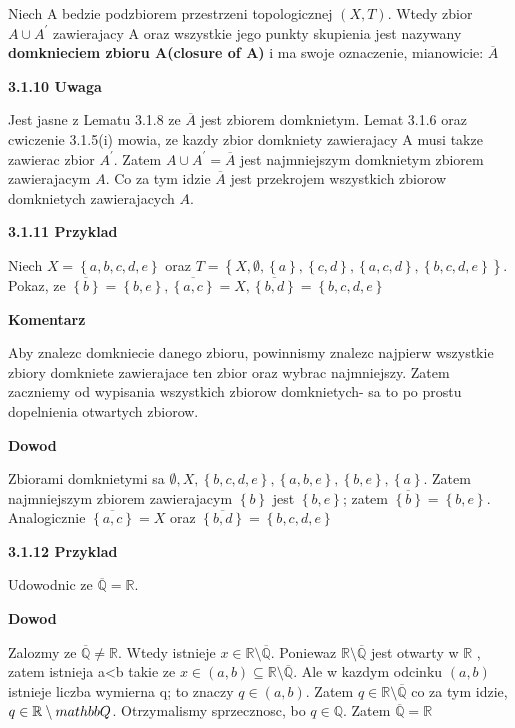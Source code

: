 \documentclass{article}
\begin{document}
\begin{tcolorbox}[colback=white!90!red,colframe=black!35!red,title=3.1.9 Definicja: Domkniecie zbioru A(closure of A)]

    Niech A bedzie podzbiorem przestrzeni topologicznej $(X,T)$. Wtedy zbior $A\cup A^{\prime}$ zawierajacy A oraz wszystkie jego punkty skupienia jest nazywany \textbf{domknieciem zbioru A(closure of A)} i ma swoje oznaczenie, mianowicie: $\overline{A}$

\end{tcolorbox}

\textbf{3.1.10 Uwaga}

Jest jasne z Lematu 3.1.8 ze $\overline{A}$ jest zbiorem domknietym. Lemat 3.1.6 oraz cwiczenie 3.1.5(i) mowia, ze kazdy zbior domkniety zawierajacy A musi takze zawierac zbior $A^{\prime}$. Zatem $A \cup A^{\prime} = \overline{A}$ jest najmniejszym domknietym zbiorem zawierajacym $A$. Co za tym idzie $\overline{A}$ jest przekrojem wszystkich zbiorow domknietych zawierajacych $A$.

\textbf{3.1.11 Przyklad}

Niech $X = \left\{ a,b,c,d,e \right\}$ oraz $T = \left\{ X, \emptyset, \left\{ a \right\}, \left\{ c,d \right\}, \left\{ a,c,d \right\}, \left\{ b,c,d,e \right\}  \right\}$. Pokaz, ze $\overline{\left\{b\right\}} = \left\{ b,e \right\}, \overline{\left\{a,c\right\}} = X, \overline{\left\{b,d\right\}} = \left\{ b,c,d,e \right\} $

\textbf{Komentarz}

Aby znalezc domkniecie danego zbioru, powinnismy znalezc najpierw wszystkie zbiory domkniete zawierajace ten zbior oraz wybrac najmniejszy. Zatem zaczniemy od wypisania wszystkich zbiorow domknietych- sa to po prostu dopelnienia otwartych zbiorow.

\textbf{Dowod}

Zbiorami domknietymi sa $\emptyset, X, \left\{ b,c,d,e \right\}, \left\{ a,b,e \right\}, \left\{ b, e \right\}, \left\{ a \right\}$. Zatem najmniejszym zbiorem zawierajacym $\left\{ b \right\}$ jest $\left\{ b,e \right\}$; zatem  $\overline{\left\{b\right\}} = \left\{ b,e \right\}$. Analogicznie $\overline{\left\{a,c\right\}} = X$ oraz $\overline{\left\{b,d\right\}} = \left\{ b,c,d,e \right\}$ 

\textbf{3.1.12 Przyklad}

Udowodnic ze $\overline{\mathbb{Q}} = \mathbb{R}$.

\textbf{Dowod}

Zalozmy ze $\overline{\mathbb{Q}} \neq \mathbb{R}$. Wtedy istnieje $x \in \mathbb{R} \setminus \overline{\mathbb{Q}}$. Poniewaz $\mathbb{R} \setminus \overline{\mathbb{Q}}$ jest otwarty w $\mathbb{R}$ , zatem istnieja a<b takie ze $x\in (a,b) \subseteq \mathbb{R}\setminus \overline{\mathbb{Q}}$. Ale w kazdym odcinku $(a,b)$
istnieje liczba wymierna q; to znaczy $q \in (a,b)$. Zatem $q \in \mathbb{R} \setminus \overline{\mathbb{Q}}$ co za tym idzie, $q\in \mathbb{R}\setminus \\mathbb{Q}$. Otrzymalismy sprzecznosc, bo $q \in \mathbb{Q}$. Zatem $\overline{\mathbb{Q}} = \mathbb{R}$
\end{document}
